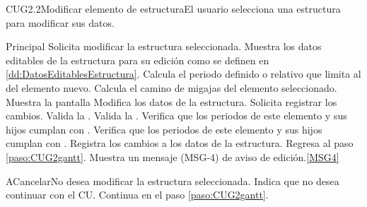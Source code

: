 	\begin{UseCase}{CUG2.2}{Modificar elemento de estructura}{El usuario selecciona una estructura para modificar sus datos.}
	\end{UseCase}

	\begin{UCtrayectoria}{Principal}
		\UCpaso[\UCactor] Solicita modificar la estructura seleccionada.
		\UCpaso Muestra los datos editables de la estructura para su edición como se definen en \ref{dd:DatosEditablesEstructura}. \label{paso:CUG2.2editaEstructura}
		\UCpaso Calcula el periodo definido o relativo que limita al del elemento nuevo.
		\UCpaso Calcula el camino de migajas del elemento seleccionado.
		\UCpaso Muestra la pantalla 
		\UCpaso [\UCactor] Modifica los datos de la estructura.
		\UCpaso [\UCactor] Solicita registrar los cambios. 
		\UCpaso Valida la  .
		\UCpaso Valida la  .
		\UCpaso Verifica que los periodos de este elemento y sus hijos cumplan con  .
		\UCpaso Verifica que los periodos de este elemento y sus hijos cumplan con  .
		\UCpaso Registra los cambios a los datos de la estructura.
		\UCpaso Regresa al paso \ref{paso:CUG2gantt}.
		\UCpaso Muestra un mensaje (MSG-4) de aviso de edición.\ref{MSG4}
	\end{UCtrayectoria}

	\begin{UCtrayectoriaA}{A}{Cancelar}{No desea modificar la estructura seleccionada.}
		\UCpaso[\UCactor] Indica que no desea continuar con el CU.
		\UCpaso Continua en el paso \ref{paso:CUG2gantt}.
	\end{UCtrayectoriaA}

